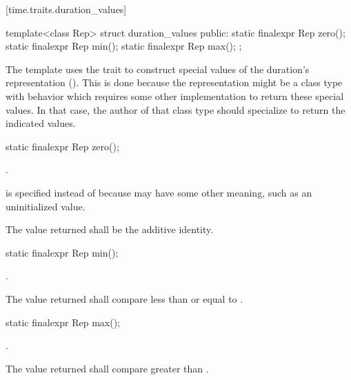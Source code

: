 [time.traits.duration_values]{}

%
\begin{itemdecl}
template<class Rep>
  struct duration_values {
  public:
    static finalexpr Rep zero();
    static finalexpr Rep min();
    static finalexpr Rep max();
};
\end{itemdecl}

\pnum
The  template uses the  trait to
construct special values of the duration's representation (). This is
done because the representation might be a class type with behavior which
requires some other implementation to return these special values. In that case,
the author of that class type should specialize  to
return the indicated values.

%
\begin{itemdecl}
static finalexpr Rep zero();
\end{itemdecl}

\begin{itemdescr}
\pnum
\returns {}. \begin{note}  is specified instead of
 because  may have some other meaning, such as an
uninitialized value. \end{note}

\pnum
\remarks The value returned shall be the additive identity.
\end{itemdescr}

%
\begin{itemdecl}
static finalexpr Rep min();
\end{itemdecl}

\begin{itemdescr}
\pnum
\returns {}.

\pnum
\remarks The value returned shall compare less than or equal to .
\end{itemdescr}

%
\begin{itemdecl}
static finalexpr Rep max();
\end{itemdecl}

\begin{itemdescr}
\pnum
\returns {}.

\pnum
\remarks The value returned shall compare greater than .
\end{itemdescr}

